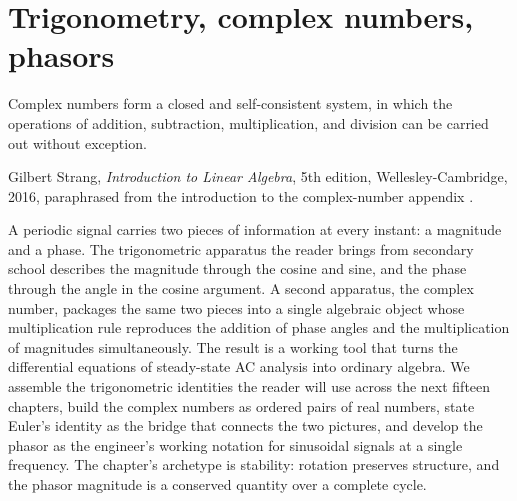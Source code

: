 \chapter{Trigonometry, complex numbers, phasors}
\label{vol02:ch03}

\epigraph{Complex numbers form a closed and self-consistent system,
in which the operations of addition, subtraction, multiplication,
and division can be carried out without exception.}{Gilbert Strang,
\textit{Introduction to Linear Algebra}, 5th edition,
Wellesley-Cambridge, 2016, paraphrased from the introduction to the
complex-number appendix \cite[appendix on complex
numbers]{text:strang2016}.}


\noindent
A periodic signal carries two pieces of information at every
instant: a magnitude and a phase. The trigonometric apparatus the
reader brings from secondary school describes the magnitude through
the cosine and sine, and the phase through the angle in the cosine
argument. A second apparatus, the complex number, packages the same
two pieces into a single algebraic object whose multiplication rule
reproduces the addition of phase angles and the multiplication of
magnitudes simultaneously. The result is a working tool that turns
the differential equations of steady-state AC analysis into
ordinary algebra. We assemble the trigonometric identities the
reader will use across the next fifteen chapters, build the complex
numbers as ordered pairs of real numbers, state Euler's identity as
the bridge that connects the two pictures, and develop the phasor
as the engineer's working notation for sinusoidal signals at a
single frequency. The chapter's archetype is stability: rotation
preserves structure, and the phasor magnitude is a conserved
quantity over a complete cycle.

